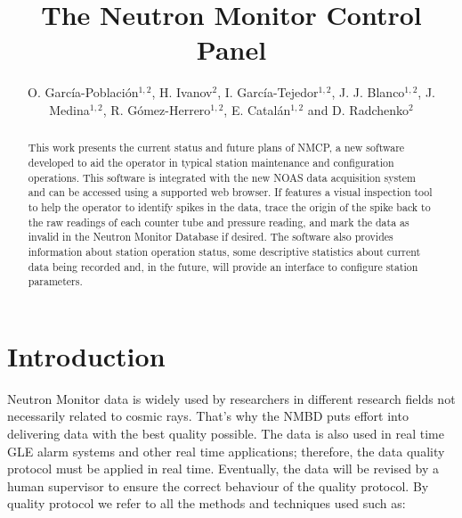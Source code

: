 \documentclass[a4paper]{jpconf}
\begin{document}
\title{The Neutron Monitor Control Panel}

\author{O. García-Población$^{1,2}$, H. Ivanov$^2$, I. García-Tejedor$^{1,2}$,
J. J. Blanco$^{1,2}$, J. Medina$^{1,2}$, R. Gómez-Herrero$^{1,2}$, E.
Catalán$^{1,2}$ and D. Radchenko$^{2}$}

\address{$^1$ Space Research Group, University of Alcalá, Spain}
\address{$^2$ Castilla-La Mancha Neutron Monitor, Parque Tecnológico de Guadalajara, Spain}


\begin{abstract}
    This work presents the current status and future plans of NMCP, a new
    software developed to aid the operator in typical station maintenance and
    configuration operations. This software is integrated with the new NOAS
    data acquisition system and can be accessed using a supported web browser.
    If features a visual inspection tool to help the operator to identify
    spikes in the data, trace the origin of the spike back to the raw readings
    of each counter tube and pressure reading, and mark the data as invalid in
    the Neutron Monitor Database if desired. The software also provides
    information about station operation status, some descriptive statistics
    about current data being recorded and, in the future, will provide an
    interface to configure station parameters.
\end{abstract}

\section{Introduction}

Neutron Monitor data is widely used by researchers in different research fields
not necessarily related to cosmic rays. That's why the NMBD\cite{NMDB2011}
puts effort into delivering data with the best quality possible. The data is
also used in real time GLE alarm systems and other real time applications;
therefore, the data quality protocol must be applied in real time. Eventually,
the data will be revised by a human supervisor to ensure the correct behaviour
of the quality protocol. By quality protocol we refer to all the methods and
techniques used such as:
\end{document}
